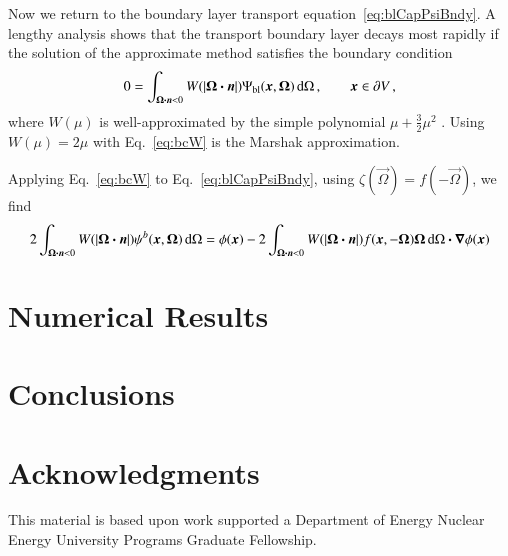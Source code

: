 \documentclass{anstrans}
\begin{document}
Now we return to the boundary layer transport equation~\eqref{eq:blCapPsiBndy}.
A lengthy analysis shows that the transport boundary layer decays most rapidly
if the solution of the approximate method satisfies the boundary condition
\begin{equation} \label{eq:bcW}
  0 = \int_{\bm{\Omega} \bm{\cdot} \bm{n} < 0} W(\left| \bm{\Omega} \bm{\cdot} \bm{n} \right|)
  \Psi_\mathrm{bl} (\bm{x}, \bm{\Omega}) \mathop{}\!\mathrm{d} \Omega\,,\qquad \bm{x} \in
  \partial V\,,
\end{equation}
where $W(\mu)$ is well-approximated by the simple polynomial $\mu +
\tfrac{3}{2} \mu^2$ \cite{Mal1991}. Using $W(\mu)=2\mu$ with
Eq.~\eqref{eq:bcW} is the Marshak approximation.

Applying Eq.~\eqref{eq:bcW} to Eq.~\eqref{eq:blCapPsiBndy}, using
$\zeta(\vec{\Omega})=f(-\vec{\Omega})$, we find
\begin{equation*}
  2\int_{\bm{\Omega}\bm{\cdot} \bm{n} < 0}
  W(\left| \bm{\Omega} \bm{\cdot} \bm{n} \right|) \psi^b(\bm{x}, \bm{\Omega}) \mathop{}\!\mathrm{d}\Omega
  = \phi(\bm{x})
  - 2\int_{\bm{\Omega}\bm{\cdot} \bm{n} < 0} W(\left| \bm{\Omega} \bm{\cdot} \bm{n} \right|)
  f(\bm{x}, -\bm{\Omega}) \bm{\Omega} \mathop{}\!\mathrm{d}\Omega
  \bm{\cdot} \bm{\nabla} \phi(\bm{x})
\end{equation*}

\section{Numerical Results}

\section{Conclusions}

\section{Acknowledgments}
This material is based upon work supported a Department of Energy Nuclear
Energy University Programs Graduate Fellowship.



\end{document}
